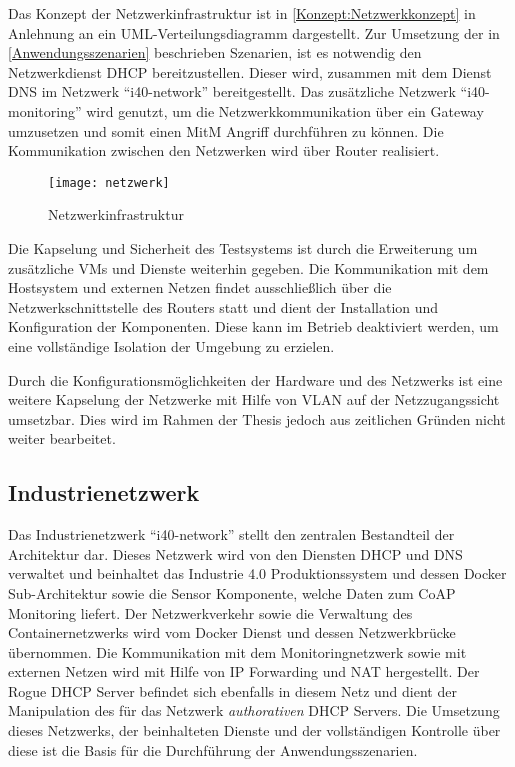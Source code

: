 Das Konzept der Netzwerkinfrastruktur ist in \autoref{Konzept:Netzwerkkonzept} in Anlehnung an ein \ac{UML}-Verteilungsdiagramm dargestellt. Zur Umsetzung der in \autoref{Anwendungsszenarien} beschrieben Szenarien, ist es notwendig den Netzwerkdienst \ac{DHCP} bereitzustellen. Dieser wird, zusammen mit dem Dienst \ac{DNS} im Netzwerk "`i40-network"' bereitgestellt. Das zusätzliche Netzwerk "`i40-monitoring"' wird genutzt, um die Netzwerkkommunikation über ein Gateway umzusetzen und somit einen \ac{MitM} Angriff durchführen zu können. Die Kommunikation zwischen den Netzwerken wird über Router realisiert.

\begin{figure}[h]
  \centering
  \texttt{[image: netzwerk]}
  \caption{Netzwerkinfrastruktur} 
  \label{Konzept:Netzwerkkonzept}
\end{figure}

Die Kapselung und Sicherheit des Testsystems ist durch die Erweiterung um zusätzliche \ac{VM}s und Dienste weiterhin gegeben. Die Kommunikation mit dem Hostsystem und externen Netzen findet ausschließlich über die Netzwerkschnittstelle des Routers statt und dient der Installation und Konfiguration der Komponenten. Diese kann im Betrieb deaktiviert werden, um eine vollständige Isolation der Umgebung zu erzielen.

Durch die Konfigurationsmöglichkeiten der Hardware und des Netzwerks ist eine weitere Kapselung der Netzwerke mit Hilfe von \ac{VLAN} auf der Netzzugangssicht umsetzbar. Dies wird im Rahmen der Thesis jedoch aus zeitlichen Gründen nicht weiter bearbeitet.

\subsection{Industrienetzwerk}
Das Industrienetzwerk "`i40-network"' stellt den zentralen Bestandteil der Architektur dar. Dieses Netzwerk wird von den Diensten \ac{DHCP} und \ac{DNS} verwaltet und beinhaltet das Industrie 4.0 Produktionssystem und dessen Docker Sub-Architektur sowie die Sensor Komponente, welche Daten zum \ac{CoAP} Monitoring liefert. Der Netzwerkverkehr sowie die Verwaltung des Containernetzwerks wird vom Docker Dienst und dessen Netzwerkbrücke übernommen. Die Kommunikation mit dem Monitoringnetzwerk sowie mit externen Netzen wird mit Hilfe von \ac{IP} Forwarding und \ac{NAT} hergestellt. Der Rogue \ac{DHCP} Server befindet sich ebenfalls in diesem Netz und dient der Manipulation des für das Netzwerk \textit{authorativen} \ac{DHCP} Servers. Die Umsetzung dieses Netzwerks, der beinhalteten Dienste und der vollständigen Kontrolle über diese ist die Basis für die Durchführung der Anwendungsszenarien.

